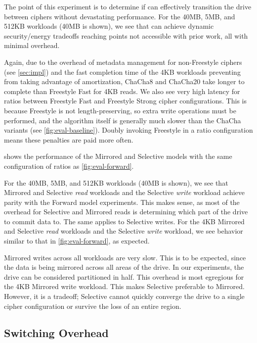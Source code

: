 The point of this experiment is to determine if \sys can effectively transition
the drive between ciphers without devastating performance. For the 40MB, 5MB,
and 512KB workloads (40MB is shown), we see that \sys can achieve dynamic
security/energy tradeoffs reaching points not accessible with prior work, all
with minimal overhead.

Again, due to the overhead of metadata management for non-Freestyle ciphers (see
\cref{sec:impl}) and the fast completion time of the 4KB workloads preventing
\sys from taking advantage of amortization, ChaCha8 and ChaCha20 take longer to
complete than Freestyle Fast for 4KB reads. We also see very high latency for
ratios between Freestyle Fast and Freestyle Strong cipher configurations. This
is because Freestyle is not length-preserving, so extra write operations must be
performed, and the algorithm itself is generally much slower than the ChaCha
variants (see \cref{fig:eval-baseline}). Doubly invoking Freestyle in a ratio
configuration means these penalties are paid more often.



 shows the performance of the Mirrored and Selective models
with the same configuration of ratios as \cref{fig:eval-forward}.

For the 40MB, 5MB, and 512KB workloads (40MB is shown), we see that Mirrored and
Selective {\em read} workloads and the Selective {\em write} workload achieve
parity with the Forward model experiments. This makes sense, as most of the
overhead for Selective and Mirrored reads is determining which part of the drive
to commit data to. The same applies to Selective writes. For the 4KB Mirrored
and Selective {\em read} workloads and the Selective {\em write} workload, we
see behavior similar to that in \cref{fig:eval-forward}, as expected.

Mirrored writes across all workloads are very slow. This is to be expected,
since the data is being mirrored across all areas of the drive. In our
experiments, the drive can be considered partitioned in half. This overhead is
most egregious for the 4KB Mirrored write workload. This makes Selective
preferable to Mirrored. However, it is a tradeoff; Selective cannot quickly
converge the drive to a single cipher configuration or survive the loss of an
entire region.


\subsection{Switching Overhead}\label{subsec:eval-overhead}

